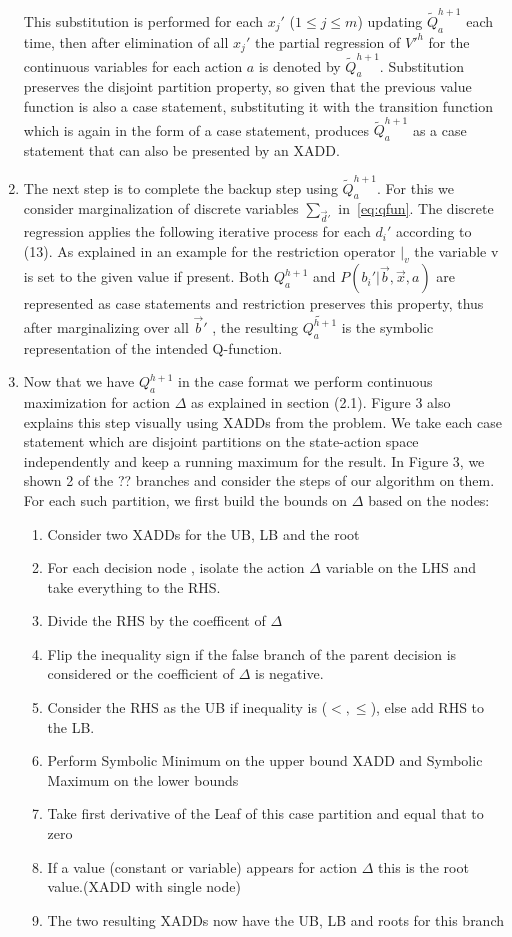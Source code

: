 \documentclass[letterpaper]{article}
\renewcommand{\-}{\text{-}}
\begin{document}
\begin{enumerate}
This substitution is performed for each $x_j'$ ($1 \leq j \leq m$) updating $\tilde{Q}_a^{h+1}$ each time,
then after elimination of all $x_j'$ the partial regression of $V'^{h}$ for the continuous variables for
each action $a$ is denoted by $\tilde{Q}_a^{h+1}$. Substitution preserves the disjoint partition property, so given that the previous value function is also a case statement, substituting it with the transition function which is again in the form of a case statement, produces $\tilde{Q}_a^{h+1}$ as a case statement that can also be presented by an XADD.

\item The next step is to complete the backup step using $\tilde{Q}_a^{h+1}$. 
For this we consider marginalization of discrete variables $\sum_{\vec{d}'}$ in~\eqref{eq:qfun}.
The discrete regression applies the following iterative process for each $d_i'$ according to (13).
As explained in an example for the restriction operator $|_v$ the variable v is set to the given value if present.
Both $Q_a^{h+1}$ and $P(b_i'|\vec{b},\vec{x},a)$ are represented
as case statements and restriction preserves this property, thus after marginalizing over all $\vec{b}'$ , the resulting $ \tilde{Q_a^{h+1}}$ is the symbolic representation
of the intended Q-function.

\item Now that we have $Q_a^{h+1}$ in
the case format we perform continuous maximization for action $\Delta$ as explained in section (2.1). Figure 3 also explains this step visually using XADDs from the \InventoryControl problem. We take each case statement which are disjoint partitions on the state-action space independently and keep a running maximum for the result. In Figure 3, we shown 2 of the ??  branches and consider the steps of our algorithm on them.
For each such partition, we first build the bounds on $\Delta$ based on the nodes: 
\begin{enumerate}
\item Consider two XADDs for the UB, LB and the root
\item For each decision node , isolate the action $\Delta$ variable on the LHS and take everything to the RHS.
\item Divide the RHS by the coefficent of $\Delta$
\item Flip the inequality sign if the false branch of the parent decision is considered or the coefficient of $\Delta$ is negative. 
\item Consider the RHS as the UB if inequality is ($<, \leq$), else add RHS to the LB.
\item Perform Symbolic Minimum on the upper bound XADD and Symbolic Maximum on the lower bounds
\item Take first derivative of the Leaf of this case partition and equal that to zero
\item If a value (constant or variable) appears for action $\Delta$ this is the root value.(XADD with single node)
\item The two resulting XADDs now have the UB, LB and roots for this branch
\end{enumerate}


\end{enumerate}
\end{document}
